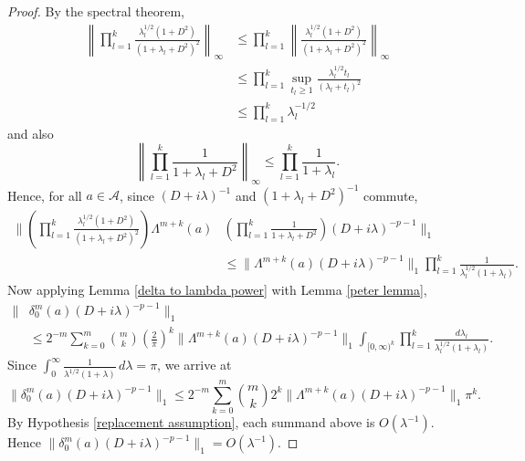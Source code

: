 \begin{proof}
        By the spectral theorem,
        \begin{align*}
            \left\|\prod_{l=1}^k \frac{\lambda_l^{1/2}(1+D^2)}{(1+\lambda_l+D^2)^2}\right\|_\infty &\leq \prod_{l=1}^k\left\|\frac{\lambda_l^{1/2}(1+D^2)}{(1+\lambda_l+D^2)^2}\right\|_\infty\\
                                                                                                   &\leq \prod_{l=1}^k \sup_{t_l\geq 1} \frac{\lambda_l^{1/2}t_l}{(\lambda_l+t_l)^2}\\
                                                                                                   &\leq \prod_{l=1}^k \lambda_l^{-1/2}
        \end{align*}    
        and also
        \begin{equation*}
            \left\|\prod_{l=1}^k \frac{1}{1+\lambda_l+D^2}\right\|_\infty \leq \prod_{l=1}^k \frac{1}{1+\lambda_l}.
        \end{equation*}
        Hence, for all $a \in \mathcal{A}$, since $(D+i\lambda)^{-1}$ and $(1+\lambda_l+D^2)^{-1}$ commute,
        \begin{align*}
            \Big\|\left(\prod_{l=1}^k \frac{\lambda_l^{1/2}(1+D^2)}{(1+\lambda_l+D^2)^2}\right)\Lambda^{m+k}(a)&\left(\prod_{l=1}^k \frac{1}{1+\lambda_l+D^2}\right)(D+i\lambda)^{-p-1}\Big\|_1\\
                                                            &\leq \|\Lambda^{m+k}(a)(D+i\lambda)^{-p-1}\|_1\prod_{l=1}^k \frac{1}{\lambda_l^{1/2}(1+\lambda_l)}.
        \end{align*}
        Now applying Lemma \ref{delta to lambda power} with Lemma \ref{peter lemma},
        \begin{align*}
            \|&\delta_0^m(a)(D+i\lambda)^{-p-1}\|_1 \\
                            &\leq 2^{-m}\sum_{k=0}^m \binom{m}{k} \left(\frac{2}{\pi}\right)^k \|\Lambda^{m+k}(a)(D+i\lambda)^{-p-1}\|_1\int_{[0,\infty)^k} \prod_{l=1}^k \frac{d\lambda_l}{\lambda_l^{1/2}(1+\lambda_l)}.
        \end{align*}
        Since $\int_0^\infty \frac{1}{\lambda^{1/2}(1+\lambda)}\,d\lambda = \pi$, we arrive at
        \begin{equation*}
            \|\delta_0^m(a)(D+i\lambda)^{-p-1}\|_{1} \leq 2^{-m} \sum_{k=0}^m \binom{m}{k} 2^k \|\Lambda^{m+k}(a)(D+i\lambda)^{-p-1}\|_1\pi^k.
        \end{equation*}
        By Hypothesis \ref{replacement assumption}, each summand above is $O(\lambda^{-1})$. Hence $\|\delta_0^m(a)(D+i\lambda)^{-p-1}\|_1 = O(\lambda^{-1})$.
        

\end{proof}
